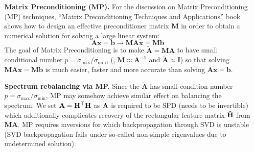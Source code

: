 \begin{table}[h]
    \centering
    \caption{\label{tab:mp}Comparison of SFA with Matrix Precond., Grassman feature map, and PCA.}
\end{table}



\vspace{0.1cm}
\noindent\textbf{Matrix Preconditioning (MP).} For the discussion on Matrix Preconditioning (MP) techniques, ``Matrix Preconditioning Techniques and Applications'' book~ %
shows how to design an effective preconditioner matrix $\mathbf{M}$ in order to obtain a numerical solution for solving a large linear system: 
\begin{equation}
    \mathbf{Ax}=\mathbf{b} \rightarrow \mathbf{MAx}=\mathbf{Mb}
\end{equation}
The goal of Matrix Preconditioning is to make $\tilde{\mathbf{A}} = \mathbf{MA}$ to have small conditional number $p= \sigma_{\text{max}} / \sigma_{\text{min}}$, (\eg,  $\mathbf{M} \approx \mathbf{A^{-1}}$ and $\tilde{\mathbf{A}} \approx \mathbf{I}$) so that solving $\mathbf{MAx}=\mathbf{Mb}$ is much easier, faster and more accurate than solving $\mathbf{Ax}=\mathbf{b}$.

\vspace{0.1cm}
\noindent\textbf{Spectrum rebalancing via MP.} Since the $\tilde{\mathbf{A}}$ has small condition number $p= \sigma_{\text{max}} / \sigma_{\text{min}}$, MP may somehow achieve similar effect on balancing the spectrum. We set ${\bf A=\mathbf{H}^\top \mathbf{H}}$ as ${\bf A}$ is required to be SPD (needs to be invertible) which additionally complicates recovery of the rectangular feature matrix $\tilde{\bf H}$ from $\mathbf{MA}$. MP requires inversions for which backpropagation through SVD is unstable (SVD backpropagation fails under so-called non-simple eigenvalues due to undetermined solution). \\


